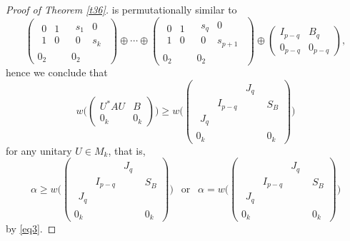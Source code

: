 \documentclass[11pt]{article}
\numberwithin{equation}{section}
\begin{document}
\begin{proof}[Proof of Theorem \ref{t36}]
is permutationally similar to
$$\left(\begin{array}{c|c}\begin{array}{cc} 0 & 1\\ 1 & 0\end{array} & \begin{array}{cc} s_1 & 0\\ 0 & s_k\end{array}
\\ \hline 0_2 & 0_2\end{array}\right)\oplus \cdots\oplus
\left(\begin{array}{c|c}\begin{array}{cc} 0 & 1\\ 1 & 0\end{array} & \begin{array}{cc} s_q & 0\\ 0 & s_{p+1}\end{array}
\\ \hline 0_2 & 0_2\end{array}\right) \oplus
\begin{pmatrix} I_{p-q} & B_q\\ 0_{p-q} & 0_{p-q}\end{pmatrix},$$
hence we conclude that
$$w\Big(\begin{pmatrix} U^*AU & B\\ 0_k & 0_k\end{pmatrix}\Big) \ge w\Big(\left(\begin{array}{c|c}\begin{array}{ccc}  & & J_q\\ & I_{p-q} & \\ J_q & & \end{array} & S_B
\\ \hline 0_k & 0_k\end{array}\right)\Big)$$
for any unitary $U\in M_k$, that is,
$$\alpha\ge
w\Big(\left(\begin{array}{c|c}\begin{array}{ccc}  & & J_q\\ & I_{p-q} & \\ J_q & & \end{array} & S_B
\\ \hline 0_k & 0_k\end{array}\right)\Big) \ \ \mbox{ or } \ \
\alpha=
w\Big(\left(\begin{array}{c|c}\begin{array}{ccc}  & & J_q\\ & I_{p-q} & \\ J_q & & \end{array} & S_B
\\ \hline 0_k & 0_k\end{array}\right)\Big)$$
by \eqref{eq3}.



\end{proof}
\end{document}
